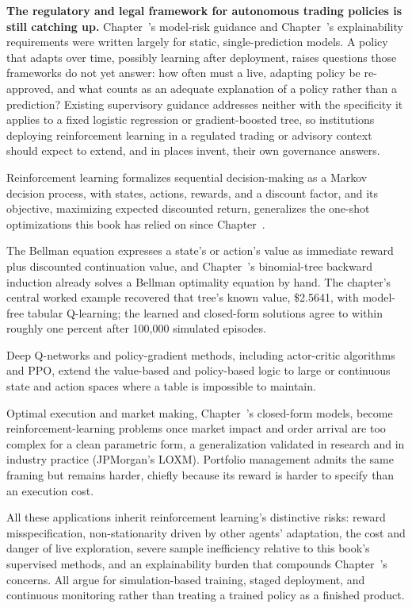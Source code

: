 \documentclass[../ai_in_finance]{subfiles}
\begin{document}
\textbf{The regulatory and legal framework for autonomous trading policies is still catching up.} Chapter~'s model-risk guidance and Chapter~'s explainability requirements were written largely for static, single-prediction models. A policy that adapts over time, possibly learning after deployment, raises questions those frameworks do not yet answer: how often must a live, adapting policy be re-approved, and what counts as an adequate explanation of a policy rather than a prediction? Existing supervisory guidance addresses neither with the specificity it applies to a fixed logistic regression or gradient-boosted tree, so institutions deploying reinforcement learning in a regulated trading or advisory context should expect to extend, and in places invent, their own governance answers.


Reinforcement learning formalizes sequential decision-making as a Markov decision process, with states, actions, rewards, and a discount factor, and its objective, maximizing expected discounted return, generalizes the one-shot optimizations this book has relied on since Chapter~.

The Bellman equation expresses a state's or action's value as immediate reward plus discounted continuation value, and Chapter~'s binomial-tree backward induction already solves a Bellman optimality equation by hand. The chapter's central worked example recovered that tree's known value, \$2.5641, with model-free tabular Q-learning; the learned and closed-form solutions agree to within roughly one percent after 100,000 simulated episodes.

Deep Q-networks and policy-gradient methods, including actor-critic algorithms and PPO, extend the value-based and policy-based logic to large or continuous state and action spaces where a table is impossible to maintain.

Optimal execution and market making, Chapter~'s closed-form models, become reinforcement-learning problems once market impact and order arrival are too complex for a clean parametric form, a generalization validated in research \parencite{nevmyvaka2006reinforcement} and in industry practice (JPMorgan's LOXM). Portfolio management admits the same framing but remains harder, chiefly because its reward is harder to specify than an execution cost.

All these applications inherit reinforcement learning's distinctive risks: reward misspecification, non-stationarity driven by other agents' adaptation, the cost and danger of live exploration, severe sample inefficiency relative to this book's supervised methods, and an explainability burden that compounds Chapter~'s concerns. All argue for simulation-based training, staged deployment, and continuous monitoring rather than treating a trained policy as a finished product.
\end{document}
